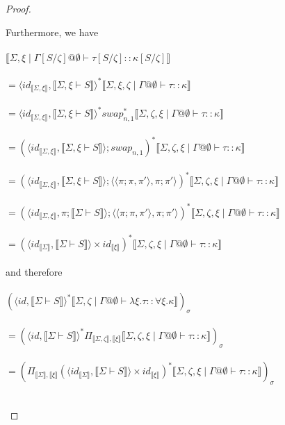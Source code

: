 \documentclass{article}
\newcommand{\sem}[1]{\llbracket #1 \rrbracket}
\begin{document}
\begin{proof}
\begin{description}
Furthermore, we have\\~\\
$\sem{\Sigma,\xi \mid \Gamma[S/\zeta] @ \emptyset \vdash \tau[S/\zeta] :: \kappa[S/\zeta]}$\\~\\
$= \langle \mathit{id}_{\sem{\Sigma,\xi}}, \sem{\Sigma,\xi \vdash S} \rangle^* \sem{\Sigma,\xi,\zeta \mid \Gamma @ \emptyset \vdash \tau :: \kappa}$\\~\\
$= \langle \mathit{id}_{\sem{\Sigma,\xi}}, \sem{\Sigma,\xi \vdash S} \rangle^* \mathit{swap}_{n,1}^*\sem{\Sigma,\zeta,\xi \mid \Gamma @ \emptyset \vdash \tau :: \kappa}$\\~\\
$= (\langle \mathit{id}_{\sem{\Sigma,\xi}}, \sem{\Sigma,\xi \vdash S} \rangle;\mathit{swap}_{n,1})^* \sem{\Sigma,\zeta,\xi \mid \Gamma @ \emptyset \vdash \tau :: \kappa}$\\~\\
$= (\langle \mathit{id}_{\sem{\Sigma,\xi}}, \sem{\Sigma,\xi \vdash S} \rangle;\langle \langle \pi;\pi, \pi' \rangle, \pi;\pi' \rangle)^* \sem{\Sigma,\zeta,\xi \mid \Gamma @ \emptyset \vdash \tau :: \kappa}$\\~\\
$= (\langle \mathit{id}_{\sem{\Sigma,\xi}}, \pi;\sem{\Sigma \vdash S} \rangle;\langle \langle \pi;\pi, \pi' \rangle, \pi;\pi' \rangle)^* \sem{\Sigma,\zeta,\xi \mid \Gamma @ \emptyset \vdash \tau :: \kappa}$\\~\\
$= (\langle \mathit{id}_{\sem{\Sigma}}, \sem{\Sigma \vdash S} \rangle \times \mathit{id}_{\sem{\xi}})^* \sem{\Sigma,\zeta,\xi \mid \Gamma @ \emptyset \vdash \tau :: \kappa}$\\~\\ 
and therefore\\~\\
$(\langle \mathit{id}, \sem{\Sigma \vdash S} \rangle^* \sem{\Sigma,\zeta \mid \Gamma @ \emptyset \vdash \lambda \xi. \tau :: \forall \xi. \kappa})_\sigma$\\~\\
$= (\langle \mathit{id}, \sem{\Sigma \vdash S} \rangle^* \Pi_{\sem{\Sigma,\zeta}, \sem{\xi}} \sem{\Sigma,\zeta,\xi \mid \Gamma @ \emptyset \vdash \tau :: \kappa})_\sigma$\\~\\
$= (\Pi_{\sem{\Sigma},\sem{\xi}} (\langle \mathit{id}_{\sem{\Sigma}}, \sem{\Sigma \vdash S} \rangle \times \mathit{id}_{\sem{\xi}})^* \sem{\Sigma,\zeta,\xi \mid \Gamma @ \emptyset \vdash \tau :: \kappa})_\sigma$\\~\\

\end{description}
\end{proof}
\end{document}

